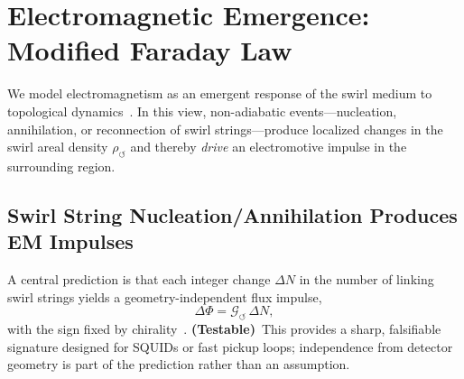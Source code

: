 \documentclass[10pt,reprint,aps,onecolumn,nofootinbib]{revtex4-2}
\newcommand{\testable}{\textbf{(Testable)}}
\begin{document}
    \section{Electromagnetic Emergence: Modified Faraday Law}\label{sec:em}
    We model electromagnetism as an emergent response of the swirl medium to topological dynamics~\cite{EM_G}. In this view, non-adiabatic events—nucleation, annihilation, or reconnection of swirl strings—produce localized changes in the swirl areal density $\rho_{\circlearrowleft}$ and thereby \emph{drive} an electromotive impulse in the surrounding region.

        \subsection*{Swirl String Nucleation/Annihilation Produces EM Impulses}\label{subsec:em_g}
            A central prediction is that each integer change $\Delta N$ in the number of linking swirl strings yields a geometry-independent flux impulse,
            \[
                \Delta\Phi = \mathcal{G}_{\circlearrowleft} \,\Delta N,
            \]
            with the sign fixed by chirality~\cite{EM_G}. \testable\ This provides a sharp, falsifiable signature designed for SQUIDs or fast pickup loops; independence from detector geometry is part of the prediction rather than an assumption.
\end{document}
